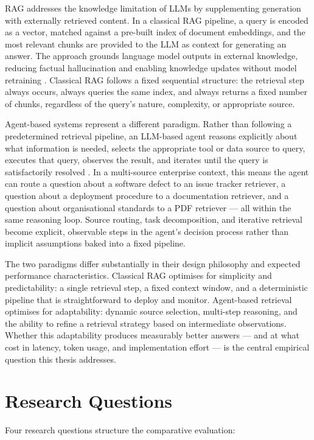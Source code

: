 RAG addresses the knowledge limitation of LLMs by supplementing generation with externally retrieved content. In a classical RAG pipeline, a query is encoded as a vector, matched against a pre-built index of document embeddings, and the most relevant chunks are provided to the LLM as context for generating an answer. The approach grounds language model outputs in external knowledge, reducing factual hallucination and enabling knowledge updates without model retraining \cite{lewis2020rag}. Classical RAG follows a fixed sequential structure: the retrieval step always occurs, always queries the same index, and always returns a fixed number of chunks, regardless of the query's nature, complexity, or appropriate source.

Agent-based systems represent a different paradigm. Rather than following a predetermined retrieval pipeline, an LLM-based agent reasons explicitly about what information is needed, selects the appropriate tool or data source to query, executes that query, observes the result, and iterates until the query is satisfactorily resolved \cite{yao2023react}. In a multi-source enterprise context, this means the agent can route a question about a software defect to an issue tracker retriever, a question about a deployment procedure to a documentation retriever, and a question about organisational standards to a PDF retriever — all within the same reasoning loop. Source routing, task decomposition, and iterative retrieval become explicit, observable steps in the agent's decision process rather than implicit assumptions baked into a fixed pipeline.

The two paradigms differ substantially in their design philosophy and expected performance characteristics. Classical RAG optimises for simplicity and predictability: a single retrieval step, a fixed context window, and a deterministic pipeline that is straightforward to deploy and monitor. Agent-based retrieval optimises for adaptability: dynamic source selection, multi-step reasoning, and the ability to refine a retrieval strategy based on intermediate observations. Whether this adaptability produces measurably better answers — and at what cost in latency, token usage, and implementation effort — is the central empirical question this thesis addresses.


\section{Research Questions}

Four research questions structure the comparative evaluation:

